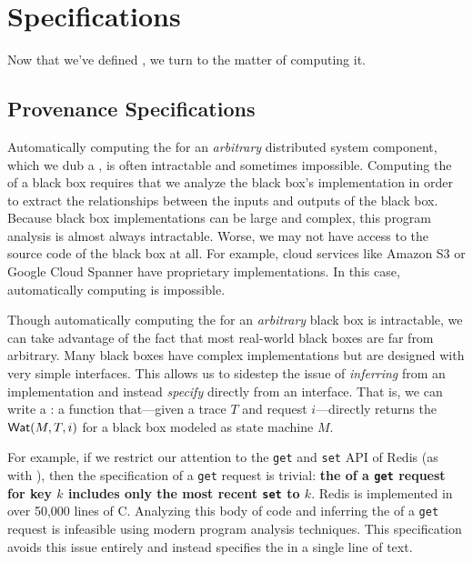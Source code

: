 \section{\WatProvenance{} Specifications}
Now that we've defined \watprovenance{}, we turn to the matter of computing it.

\subsection{Provenance Specifications}
Automatically computing the \watprovenance{} for an \emph{arbitrary}
distributed system component, which we dub a , is often
intractable and sometimes impossible. Computing the \watprovenance{} of a black
box requires that we analyze the black box's implementation in order to extract
the relationships between the inputs and outputs of the black box. Because
black box implementations can be large and complex, this program analysis is
almost always intractable. Worse, we may not have access to the source code of
the black box at all. For example, cloud services like Amazon S3 or Google
Cloud Spanner have proprietary implementations. In this case,
automatically computing \watprovenance{} is impossible.

\newcommand{\kvget}{\texttt{get}}
\newcommand{\kvset}{\texttt{set}}

Though automatically computing the \watprovenance{} for an \emph{arbitrary}
black box is intractable, we can take advantage of the fact that most
real-world black boxes are far from arbitrary. Many black boxes have complex
implementations but are designed with very simple interfaces.  This allows us
to sidestep the issue of \emph{inferring} \watprovenance{} from an
implementation and instead \emph{specify} \watprovenance{} directly from an
interface. That is, we can write a : a
function that---given a trace $T$ and request $i$---directly returns the
\watprovenance{} $\textsf{Wat}(M, T, i)$ for a black box modeled as state machine $M$.

For example, if we restrict our attention to the \kvget{} and \kvset{} API of
Redis (as with ), then the \watprovenance{}
specification of a \kvget{} request is trivial: \textbf{the \watprovenance{} of
a \kvget{} request for key $k$ includes only the most recent \kvset{} to
$k$}. Redis is implemented in over 50,000 lines of C. Analyzing this body of
code and inferring the \watprovenance{} of a \kvget{} request is infeasible
using modern program analysis techniques. This \watprovenance{} specification
avoids this issue entirely and instead specifies the \watprovenance{} in a
single line of text.

